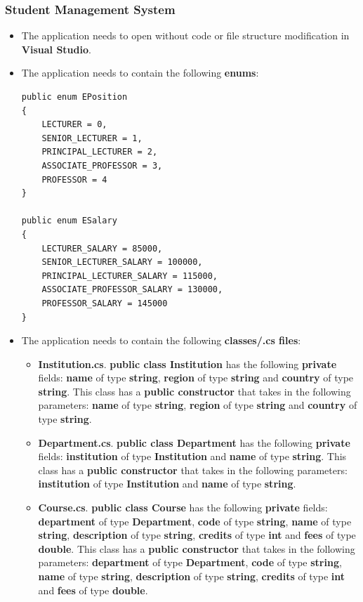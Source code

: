 \documentclass{article}
\begin{document}
\subsubsection*{Student Management System}
\begin{itemize}
    \item The application needs to open without code or file structure modification in \textbf{Visual Studio}.
    \item The application needs to contain the following \textbf{enums}:
    \begin{verbatim}
public enum EPosition
{
    LECTURER = 0,
    SENIOR_LECTURER = 1,
    PRINCIPAL_LECTURER = 2,
    ASSOCIATE_PROFESSOR = 3,
    PROFESSOR = 4
}
            
public enum ESalary
{
    LECTURER_SALARY = 85000,
    SENIOR_LECTURER_SALARY = 100000,
    PRINCIPAL_LECTURER_SALARY = 115000,
    ASSOCIATE_PROFESSOR_SALARY = 130000,
    PROFESSOR_SALARY = 145000
}
    \end{verbatim}
    \item The application needs to contain the following \textbf{classes/.cs files}:
    \begin{itemize}
        \item \textbf{Institution.cs}. \textbf{public class Institution} has the following \textbf{private} fields: \textbf{name} of type \textbf{string}, \textbf{region} of type \textbf{string} and \textbf{country} of type \textbf{string}. This class has a \textbf{public constructor} that takes in the following parameters: \textbf{name} of type \textbf{string}, \textbf{region} of type \textbf{string} and \textbf{country} of type \textbf{string}. 
        \item \textbf{Department.cs}. \textbf{public class Department} has the following \textbf{private} fields: \textbf{institution} of type \textbf{Institution} and \textbf{name} of type \textbf{string}. This class has a \textbf{public constructor} that takes in the following parameters: \textbf{institution} of type \textbf{Institution} and \textbf{name} of type \textbf{string}.
        \item \textbf{Course.cs}. \textbf{public class Course} has the following \textbf{private} fields: \textbf{department} of type \textbf{Department}, \textbf{code} of type \textbf{string}, \textbf{name} of type \textbf{string}, \textbf{description} of type \textbf{string}, \textbf{credits} of type \textbf{int} and \textbf{fees} of type \textbf{double}. This class has a \textbf{public constructor} that takes in the following parameters: \textbf{department} of type \textbf{Department}, \textbf{code} of type \textbf{string}, \textbf{name} of type \textbf{string}, \textbf{description} of type \textbf{string}, \textbf{credits} of type \textbf{int} and \textbf{fees} of type \textbf{double}.

\end{itemize}
\end{itemize}
\end{document}
